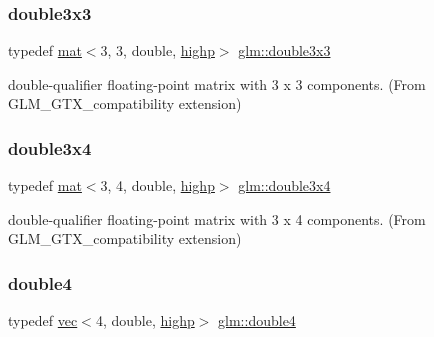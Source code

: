 \subsubsection{\texorpdfstring{double3x3}{double3x3}}
{\footnotesize\ttfamily typedef \mbox{\hyperlink{structglm_1_1mat}{mat}}$<$3, 3, double, \mbox{\hyperlink{namespaceglm_a36ed105b07c7746804d7fdc7cc90ff25ac6f7eab42eacbb10d59a58e95e362074}{highp}}$>$ \mbox{\hyperlink{group__gtx__compatibility_ga7cf33790969e0985a53ff01d914bf8ef}{glm\+::double3x3}}}



double-\/qualifier floating-\/point matrix with 3 x 3 components. (From G\+L\+M\+\_\+\+G\+T\+X\+\_\+compatibility extension) 

\mbox{\label{group__gtx__compatibility_gad93d79598c615c80626e270f4357d189}} 
\subsubsection{\texorpdfstring{double3x4}{double3x4}}
{\footnotesize\ttfamily typedef \mbox{\hyperlink{structglm_1_1mat}{mat}}$<$3, 4, double, \mbox{\hyperlink{namespaceglm_a36ed105b07c7746804d7fdc7cc90ff25ac6f7eab42eacbb10d59a58e95e362074}{highp}}$>$ \mbox{\hyperlink{group__gtx__compatibility_gad93d79598c615c80626e270f4357d189}{glm\+::double3x4}}}



double-\/qualifier floating-\/point matrix with 3 x 4 components. (From G\+L\+M\+\_\+\+G\+T\+X\+\_\+compatibility extension) 

\mbox{\label{group__gtx__compatibility_gadfb754a50db97dcefbd7a3435ad6eda4}} 
\subsubsection{\texorpdfstring{double4}{double4}}
{\footnotesize\ttfamily typedef \mbox{\hyperlink{structglm_1_1vec}{vec}}$<$4, double, \mbox{\hyperlink{namespaceglm_a36ed105b07c7746804d7fdc7cc90ff25ac6f7eab42eacbb10d59a58e95e362074}{highp}}$>$ \mbox{\hyperlink{group__gtx__compatibility_gadfb754a50db97dcefbd7a3435ad6eda4}{glm\+::double4}}}



